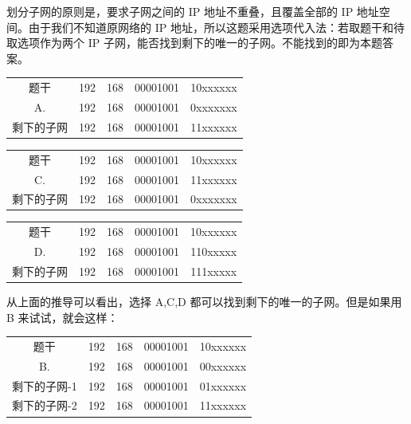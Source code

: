 \documentclass[UTF8]{ctexart}
\newcommand\col[1]{\textcolor{green!50!black}{#1}}
\newcommand\dotting{\ .\ }
\newcommand\Emph[1]{\colorbox{green!10}{\textcolor{green!30!black}{#1}}}
\begin{document}
划分子网的原则是，要求子网之间的 IP 地址不重叠，且覆盖全部的 IP 地址空间。由于我们不知道原网络的 IP 地址，所以这题采用选项代入法：若取题干和待取选项作为两个 IP 子网，能否找到剩下的\Emph{唯一的}子网。不能找到的即为本题答案。

\begin{table}[H]
    \centering
    \begin{tabular}{cc@{\dotting}c@{\dotting}c@{\dotting}c}
        题干 & \col{192} & \col{168} & \col{00001001} & \col{10}xxxxxx \\
        A.   & \col{192} & \col{168} & \col{00001001} & \col{0}xxxxxxx \\
        剩下的子网 &  \col{192} & \col{168} & \col{00001001} & \col{11}xxxxxx \\
    \end{tabular}
\end{table}

\begin{table}[H]
    \centering
    \begin{tabular}{cc@{\dotting}c@{\dotting}c@{\dotting}c}
        题干 & \col{192} & \col{168} & \col{00001001} & \col{10}xxxxxx \\
        C.   & \col{192} & \col{168} & \col{00001001} & \col{11}xxxxxx \\
        剩下的子网 &  \col{192} & \col{168} & \col{00001001} & \col{0}xxxxxxx \\
    \end{tabular}
\end{table}

\begin{table}[H]
    \centering
    \begin{tabular}{cc@{\dotting}c@{\dotting}c@{\dotting}c}
        题干 & \col{192} & \col{168} & \col{00001001} & \col{10}xxxxxx \\
        D.   & \col{192} & \col{168} & \col{00001001} & \col{110}xxxxx \\
        剩下的子网 &  \col{192} & \col{168} & \col{00001001} & \col{111}xxxxx \\
    \end{tabular}
\end{table}

从上面的推导可以看出，选择 A,C,D 都可以找到剩下的\Emph{唯一的}子网。但是如果用 B 来试试，就会这样：

\begin{table}[H]
    \centering
    \begin{tabular}{cc@{\dotting}c@{\dotting}c@{\dotting}c}
        题干 & \col{192} & \col{168} & \col{00001001} & \col{10}xxxxxx \\
        B.   & \col{192} & \col{168} & \col{00001001} & \col{00}xxxxxx \\
        剩下的子网-1 &  \col{192} & \col{168} & \col{00001001} & \col{01}xxxxxx \\
        剩下的子网-2 &  \col{192} & \col{168} & \col{00001001} & \col{11}xxxxxx \\
    \end{tabular}
\end{table}
\end{document}
